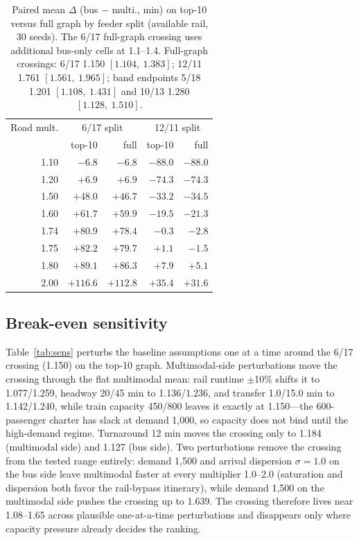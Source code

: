 \documentclass{ieeeaccess}
\begin{document}
\begin{table}[!t]
\caption{Paired mean $\Delta$ (bus $-$ multi., min) on top-10 versus full graph by feeder split (available rail, 30 seeds). The 6/17 full-graph crossing uses additional bus-only cells at 1.1--1.4. Full-graph crossings: 6/17 1.150 $[1.104,\ 1.383]$; 12/11 1.761 $[1.561,\ 1.965]$; band endpoints 5/18 1.201 $[1.108,\ 1.431]$ and 10/13 1.280 $[1.128,\ 1.510]$.}
\label{tab:fullbe}
\centering
\footnotesize
\begin{tabular}{@{}r@{\quad}rr@{\quad}rr@{}}
\hline
Road mult. & \multicolumn{2}{c}{6/17 split} & \multicolumn{2}{c}{12/11 split} \\
 & top-10 & full & top-10 & full \\
\hline
1.10 & $-6.8$ & $-6.8$ & $-88.0$ & $-88.0$ \\
1.20 & $+6.9$ & $+6.9$ & $-74.3$ & $-74.3$ \\
1.50 & $+48.0$ & $+46.7$ & $-33.2$ & $-34.5$ \\
1.60 & $+61.7$ & $+59.9$ & $-19.5$ & $-21.3$ \\
1.74 & $+80.9$ & $+78.4$ & $-0.3$ & $-2.8$ \\
1.75 & $+82.2$ & $+79.7$ & $+1.1$ & $-1.5$ \\
1.80 & $+89.1$ & $+86.3$ & $+7.9$ & $+5.1$ \\
2.00 & $+116.6$ & $+112.8$ & $+35.4$ & $+31.6$ \\
\hline
\end{tabular}
\end{table}

\subsection{Break-even sensitivity}
Table~\ref{tab:sens} perturbs the baseline assumptions one at a time around the 6/17 crossing (1.150) on the top-10 graph. Multimodal-side perturbations move the crossing through the flat multimodal mean: rail runtime $\pm$10\% shifts it to 1.077/1.259, headway 20/45 min to 1.136/1.236, and transfer 1.0/15.0 min to 1.142/1.240, while train capacity 450/800 leaves it exactly at 1.150---the 600-passenger charter has slack at demand 1{,}000, so capacity does not bind until the high-demand regime. Turnaround 12 min moves the crossing only to 1.184 (multimodal side) and 1.127 (bus side). Two perturbations remove the crossing from the tested range entirely: demand 1{,}500 and arrival dispersion $\sigma=1.0$ on the bus side leave multimodal faster at every multiplier 1.0--2.0 (saturation and dispersion both favor the rail-bypass itinerary), while demand 1{,}500 on the multimodal side pushes the crossing up to 1.639. The crossing therefore lives near 1.08--1.65 across plausible one-at-a-time perturbations and disappears only where capacity pressure already decides the ranking.
\end{document}
